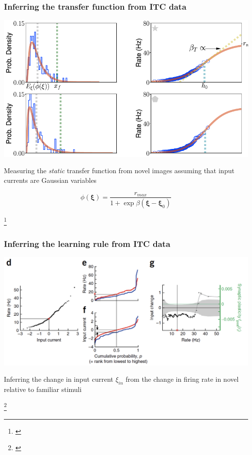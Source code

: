 \documentclass[aspectratio=169]{beamer}
\begin{document}
\begin{frame}[plain]
\frametitle{Inferring the transfer function from ITC data}

\vspace{0.2in}

\begin{center}
\includegraphics[scale=0.5]{transfer-function}
\end{center}

Measuring the \emph{static} transfer function from novel images assuming that input currents are Gaussian variables

\begin{equation*}
\phi(\bm{\xi}) = \frac{r_{max}}{1 + \exp \beta (\bm{\xi}- \bm{\xi}_{0})}
\end{equation*}


\footnote{\cite{peirera}}
\end{frame}

\begin{frame}[plain]
\frametitle{Inferring the learning rule from ITC data}

\begin{center}
\includegraphics[scale=0.55]{learning-rules}
\end{center}

Inferring the change in input current $\xi_{in}$ from the change in firing rate in {\color{red} novel} relative to {\color{blue} familiar} stimuli

\footnote{\cite{lim}}

\end{frame}
\end{document}
